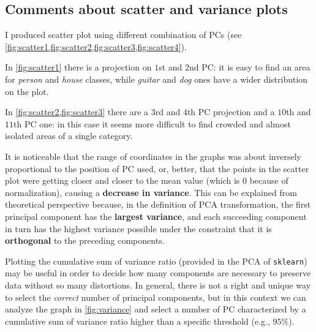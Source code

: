 \documentclass[a4paper, 11pt]{article}
\begin{document}
	\subsection{Comments about scatter and variance plots}
	I produced scatter plot using different combination of PCs (see \vref{fig:scatter1,fig:scatter2,fig:scatter3,fig:scatter4}).
	
	In \cref{fig:scatter1} there is a projection on $1$st and $2$nd PC: it is easy to find an area for \textit{person} and \textit{house} classes, while \textit{guitar} and \textit{dog} ones have a wider distribution on the plot.
	
	In \cref{fig:scatter2,fig:scatter3} there are a $3$rd and $4$th PC projection and a $10$th and $11$th PC one: in this case it seems more difficult to find crowded and almost isolated areas of a single category.
	
	It is noticeable that the range of coordinates in the graphs was about inversely proportional to the position of PC used, or, better, that the points in the scatter plot were getting closer and closer to the mean value (which is $0$ because of normalization), causing a \textbf{decrease in variance}. This can be explained from theoretical perspective because, in the definition of PCA transformation, the first principal component has the \textbf{largest variance}, and each succeeding component in turn has the highest variance possible under the constraint that it is \textbf{orthogonal} to the preceding components.
	
	Plotting the cumulative sum of variance ratio (provided in the PCA of \texttt{sklearn}) may be useful in order to decide how many components are necessary to preserve data without so many distortions. In general, there is not a right and unique way to select the \textit{correct} number of principal  components, but in this context we can analyze the graph in \vref{fig:variance} and select a number of PC characterized by a cumulative sum of variance ratio higher than a specific threshold (e.g., $95\%$).
	
\end{document}

